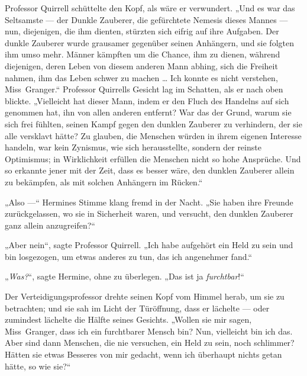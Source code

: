 Professor Quirrell schüttelte den Kopf, als wäre er verwundert.
„Und es war das Seltsamste — der Dunkle Zauberer, die gefürchtete Nemesis dieses Mannes — nun, diejenigen, die ihm dienten, stürzten sich eifrig auf ihre Aufgaben. Der dunkle Zauberer wurde grausamer gegenüber seinen Anhängern, und sie folgten ihm umso mehr. Männer kämpften um die Chance, ihm zu dienen, während diejenigen, deren Leben von diesem anderen Mann abhing, sich die Freiheit nahmen, ihm das Leben schwer zu machen … Ich konnte es nicht verstehen, Miss~Granger.“
Professor Quirrells Gesicht lag im Schatten, als er nach oben blickte.
„Vielleicht hat dieser Mann, indem er den Fluch des Handelns auf sich genommen hat, ihn von allen anderen entfernt? War das der Grund, warum sie sich frei fühlten, seinen Kampf gegen den dunklen Zauberer zu verhindern, der sie alle versklavt hätte? Zu glauben, die Menschen würden in ihrem eigenen Interesse handeln, war kein Zynismus, wie sich herausstellte, sondern der reinste Optimismus; in Wirklichkeit erfüllen die Menschen nicht so hohe Ansprüche. Und so erkannte jener mit der Zeit, dass es besser wäre, den dunklen Zauberer allein zu bekämpfen, als mit solchen Anhängern im Rücken.“

„Also —“ Hermines Stimme klang fremd in der Nacht.
„Sie haben ihre Freunde zurückgelassen, wo sie in Sicherheit waren, und versucht, den dunklen Zauberer ganz allein anzugreifen?“

„Aber nein“, sagte Professor Quirrell.
„Ich habe aufgehört ein Held zu sein und bin losgezogen, um etwas anderes zu tun, das ich angenehmer fand.“

„\emph{Was?}“, sagte Hermine, ohne zu überlegen.
„Das ist ja \emph{furchtbar}!“

Der Verteidigungsprofessor drehte seinen Kopf vom Himmel herab, um sie zu betrachten; und sie sah im Licht der Türöffnung, dass er lächelte — oder zumindest lächelte die Hälfte seines Gesichts.
„Wollen sie mir sagen, Miss~Granger, dass ich ein furchtbarer Mensch bin? Nun, vielleicht bin ich das. Aber sind dann Menschen, die nie versuchen, ein Held zu sein, noch schlimmer? Hätten sie etwas Besseres von mir gedacht, wenn ich überhaupt nichts getan hätte, so wie sie?“

